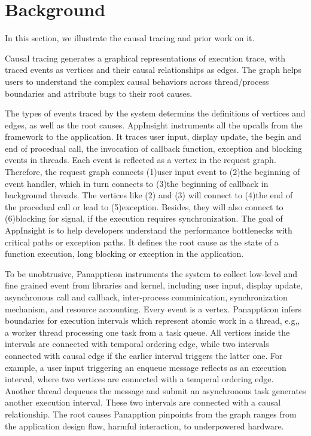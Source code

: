 \section{Background} \label{sec:background}

In this section, we illustrate the causal tracing and prior work on it.

Causal tracing generates a graphical representations of execution trace, with
traced events as vertices and their causal relationships as edges. The graph
helps users to understand the complex causal behaviors across thread/process
boundaries and attribute bugs to their root causes.

The types of events traced by the system determins the definitions of vertices
and edges, as well as the root causes. AppInsight instruments all the upcalls
from the framework to the application. It traces user input, display update,
the begin and end of procedual call, the invocation of callback function,
exception and blocking events in threads. Each event is reflected as a vertex
in the request graph. Therefore, the request graph connects (1)user input
event to (2)the beginning of event handler, which in turn connects to (3)the
beginning of callback in background threads. The vertices like (2) and (3) will
connect to (4)the end of the procedual call or lead to (5)exception. Besides,
they will also connect to (6)blocking for signal, if the execution requires
synchronization. The goal of AppInsight is to help developers understand the
performance bottlenecks with critical paths or exception paths. It defines the
root cause as the state of a function execution, long blocking or exception in
the application.

To be unobtrusive, Panappticon instruments the system to collect low-level
and fine grained event from libraries and kernel, including user input,
display update, asynchronous call and callback, inter-process comminication,
synchronization mechanism, and resource accounting. Every event is a vertex.
Panappticon infers boundaries for execution intervals which represent atomic
work in a thread, e.g,, a worker thread processing one task from a task queue.
All vertices inside the intervals are connected with temporal ordering edge,
while two intervals connected with causal edge if the earlier interval triggers
the latter one. For example, a user input triggering an enqueue message reflects
as an execution interval, where two vertices are connected with a temperal
ordering edge. Another thread dequeues the message and submit an asynchronous
task generates another execution interval. These two intervals are connected
with a causal relationship. The root causes Panapption pinpoints from the graph
ranges from the application design flaw, harmful interaction, to underpowered
hardware.
